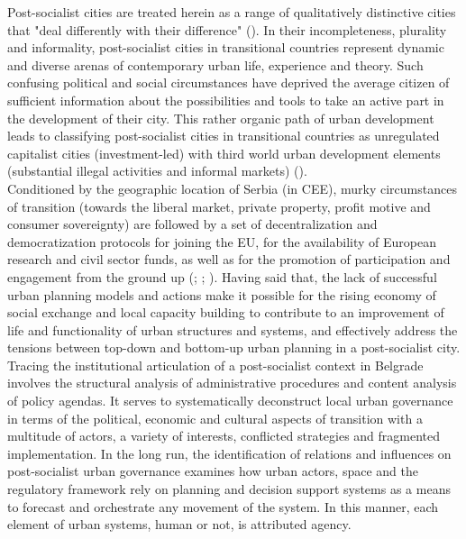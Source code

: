 \documentclass[11pt]{report}
\begin{document}
{Post-socialist cities are treated herein as a range of qualitatively distinctive cities that "deal differently with their difference" ({\citealt{amin_ordinary_1997}). In their incompleteness, plurality and informality, post-socialist cities in transitional countries represent dynamic and diverse arenas of contemporary urban life, experience and theory. Such confusing political and social circumstances have deprived the average citizen of sufficient information about the possibilities and tools to take an active part in the development of their city. 
This rather organic path of urban development leads to classifying post-socialist cities in transitional countries as unregulated capitalist cities (investment-led) with third world urban development elements (substantial illegal activities and informal markets) (\href{ref}{\citealt{petrovic_cities_2009}}).
\\

Conditioned by the geographic location of Serbia (in CEE), murky circumstances of transition (towards the liberal market, private property, profit motive and consumer sovereignty) are followed by a set of decentralization and democratization protocols for joining the EU, for the availability of European research and civil sector funds, as well as for the promotion of participation and engagement from the ground up (\citealt{vujosevic_conundrum_2012}; \citealt{vujosevic_regionalizam_2015}; \citealt{zekovic_spatial_2015}).
Having said that, the lack of successful urban planning models and actions make it possible for the rising economy of social exchange and local capacity building to contribute to an improvement of life and functionality of urban structures and systems, and effectively address the tensions between top-down and bottom-up urban planning in a post-socialist city.
\\

Tracing the institutional articulation of a post-socialist context in Belgrade involves the structural analysis of administrative procedures and content analysis of policy agendas. It serves to systematically deconstruct local urban governance in terms of the political, economic and cultural aspects of transition with a multitude of actors, a variety of interests, conflicted strategies and fragmented implementation. In the long run, the identification of relations and influences on post-socialist urban governance examines how urban actors, space and the regulatory framework rely on planning and decision support systems as a means to forecast and orchestrate any movement of the system. In this manner, each element of urban systems, human or not, is attributed agency.
\\

}}
\end{document}
